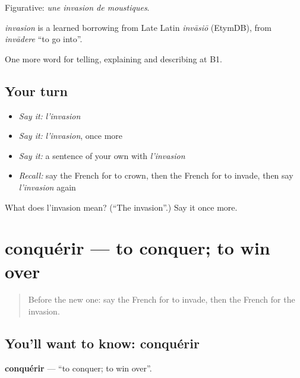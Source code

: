 Figurative: \emph{une invasion de moustiques}.

\begin{cousinweb}
\emph{invasion} is a learned borrowing from Late Latin \emph{invāsiō} (EtymDB), from \emph{invādere} \textquotedblleft{}to go into\textquotedblright{}.
\end{cousinweb}

\begin{grammarlens}[title={What you've built}]
One more word for telling, explaining and describing at B1.
\end{grammarlens}

\subsection*{Your turn}
\begin{itemize}
\raggedright
  \item \emph{Say it:} \emph{l'invasion}
  \item \emph{Say it:} \emph{l'invasion}, once more
  \item \emph{Say it:} a sentence of your own with \emph{l'invasion}
  \item \emph{Recall:} say the French for to crown, then the French for to invade, then say \emph{l'invasion} again
\end{itemize}

\begin{tcolorbox}[breakable,colback=teal!4,colframe=teal!35!black,title={Before you move on}]
What does l'invasion mean? (\textquotedblleft{}The invasion\textquotedblright{}.) Say it once more.
\end{tcolorbox}
\section[conquérir]{conquérir — to conquer; to win over}

\label{lesson:FR-C324-conquerir}



\begin{quote}
Before the new one: say the French for to invade, then the French for the invasion.
\end{quote}

\subsection*{You'll want to know: conquérir}
\textbf{conquérir} — \textquotedblleft{}to conquer; to win over\textquotedblright{}.

